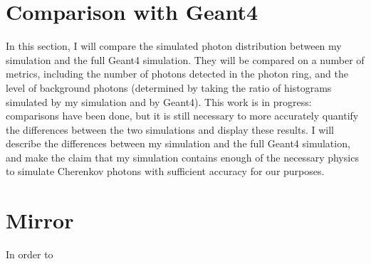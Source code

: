 \section{Comparison with Geant4} 
In this section, I will compare the simulated photon distribution between my simulation and the full Geant4 simulation.
They will be compared on a number of metrics, including the number of photons detected in the photon ring, and the level of background photons (determined by taking the ratio of histograms simulated by my simulation and by Geant4). This work is in progress: comparisons have been done, but it is still necessary to more accurately quantify the differences between the two simulations and display these results. I will describe the differences between my simulation and the full Geant4 simulation, and make the claim that my simulation contains enough of the necessary physics to simulate Cherenkov photons with sufficient accuracy for our purposes.

\section{Mirror}
In order to 

\endinput

Any text after an \endinput is ignored.
You could put scraps here or things in progress.
